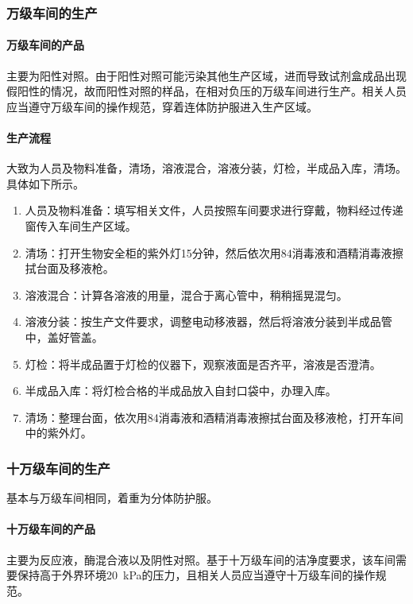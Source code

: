 \subsubsection{万级车间的生产}

\paragraph{万级车间的产品} 主要为阳性对照。由于阳性对照可能污染其他生产区域，进而导致试剂盒成品出现假阳性的情况，故而阳性对照的样品，在相对负压的万级车间进行生产。相关人员应当遵守万级车间的操作规范，穿着连体防护服进入生产区域。

\paragraph{生产流程} 大致为人员及物料准备，清场，溶液混合，溶液分装，灯检，半成品入库，清场。具体如下所示。
\begin{enumerate}
    \item 人员及物料准备：填写相关文件，人员按照车间要求进行穿戴，物料经过传递窗传入车间生产区域。
    \item 清场：打开生物安全柜的紫外灯15分钟，然后依次用84消毒液和酒精消毒液擦拭台面及移液枪。
    \item 溶液混合：计算各溶液的用量，混合于离心管中，稍稍摇晃混匀。
    \item 溶液分装：按生产文件要求，调整电动移液器，然后将溶液分装到半成品管中，盖好管盖。
    \item 灯检：将半成品置于灯检的仪器下，观察液面是否齐平，溶液是否澄清。
    \item 半成品入库：将灯检合格的半成品放入自封口袋中，办理入库。
    \item 清场：整理台面，依次用84消毒液和酒精消毒液擦拭台面及移液枪，打开车间中的紫外灯。
\end{enumerate}

\subsubsection{十万级车间的生产}

基本与万级车间相同，着重为分体防护服。

\paragraph{十万级车间的产品} 主要为反应液，酶混合液以及阴性对照。基于十万级车间的洁净度要求，该车间需要保持高于外界环境\SI{20}{\kilo\pascal}的压力，且相关人员应当遵守十万级车间的操作规范。

